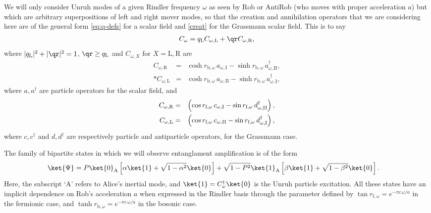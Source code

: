  We will only consider Unruh modes of a given Rindler frequency $\omega$ as seen by Rob or AntiRob (who moves with proper acceleration $a$) but which are arbitrary superpositions of left and right mover modes, so that the creation and annihilation operators that we are considering here are  of the general form \eqref{eq:q-defs} for a scalar field and \eqref{creat} for the Grassmann scalar field. This is to say
 \begin{align}C_\omega=q_\text{L}C_{\omega,\text{L}}+\qr C_{\omega,\text{R}}\label{umodes},\end{align}
where $\vert q_\text{L}\vert^2+\vert\qr\vert^2=1$, $\qr \ge q_\text{L}$ and $C_{\omega,X}$ for $X=\text{L},\text{R}$ are
\begin{eqnarray}\label{bogoboson}
 C_{\omega,\text{R}}&=&\cosh r_{\text{b},\omega}\, a_{\omega,\text{I}} - \sinh r_{\text{b},\omega}\, a^\dagger_{\omega,\text{II}},\\*
 C_{\omega,\text{L}}&=&\cosh r_{\text{b},\omega}\, a_{\omega,\text{II}} - \sinh r_{\text{b},\omega}\, a^\dagger_{\omega,\text{I}}, \end{eqnarray}
where $a,a^\dagger$ are particle operators for the scalar field, and
\begin{eqnarray}\label{Unruhop}
\nonumber C_{\omega,\text{\text{R}}}&=&\left(\cos r_{\text{f},\omega}\, c_{\omega,\text{I}}-\sin r_{\text{f},\omega}\, d^\dagger_{\omega,\text{II}}\right),\\*
C_{\omega,\text{\text{L}}}&=&\left(\cos r_{\text{f},\omega}\, c_{\omega,\text{II}}-\sin r_{\text{f},\omega}\, d^\dagger_{\omega,\text{I}}\right),
\end{eqnarray}
where $c,c^\dagger$ and $d,d^\dagger$ are respectively particle and antiparticle operators, for the Grassmann case.

The family of bipartite states in which we will observe entanglament amplification is of the form 
\begin{align}\label{geGras} \ket{\Psi}&= P \ket{0}_\text{A} \left[\alpha\ket{1} +\sqrt{1-\alpha^2}\ket{0}\right] + \sqrt{1-P^2}\ket{1}_\text{A} \left[\beta\ket{1}+ \sqrt{1-\beta^2}\ket{0}\right]
.\end{align}
Here, the subscript `A' refers to Alice's inertial mode, and $\ket{1}=C^\dagger_\omega\ket{0}$ is the Unruh particle excitation. All these states have an implicit dependence on Rob's acceleration $a$ when expressed in the Rindler basis through the parameter defined by $\tan r_{\text{f},\omega}=e^{-\pi c\,\omega/a}$ in the fermionic case, and $\tanh r_{\text{b},\omega}=e^{-\pi c\,\omega/a}$ in the bosonic case.

